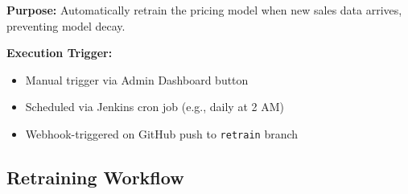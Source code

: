 \documentclass[12pt,a4paper]{report}
\begin{document}
\textbf{Purpose:} Automatically retrain the pricing model when new sales data arrives, preventing model decay.

\textbf{Execution Trigger:}
\begin{itemize}[leftmargin=2em]
    \item Manual trigger via Admin Dashboard button
    \item Scheduled via Jenkins cron job (e.g., daily at 2 AM)
    \item Webhook-triggered on GitHub push to \texttt{retrain} branch
\end{itemize}

\subsection{Retraining Workflow}
\end{document}
